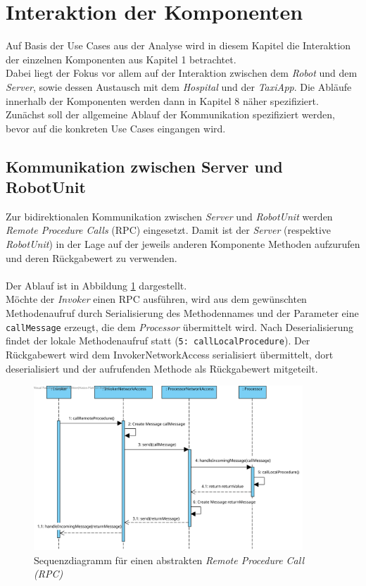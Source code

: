 \section{Interaktion der Komponenten}
Auf Basis der Use Cases aus der Analyse wird in diesem Kapitel die Interaktion der einzelnen Komponenten aus Kapitel 1 betrachtet. \\
Dabei liegt der Fokus vor allem auf der Interaktion zwischen dem \emph{Robot} und dem \emph{Server}, sowie dessen Austausch mit dem \emph{Hospital} und der \emph{TaxiApp}. 
Die Abläufe innerhalb der Komponenten werden dann in Kapitel 8 näher spezifiziert. \\
Zunächst soll der allgemeine Ablauf der Kommunikation spezifiziert werden, bevor auf die konkreten Use Cases eingangen wird.

\subsection*{Kommunikation zwischen Server und RobotUnit}
Zur bidirektionalen Kommunikation zwischen \emph{Server} und \emph{RobotUnit} werden \emph{Remote Procedure Calls} (RPC) eingesetzt. Damit ist der \emph{Server} (respektive \emph{RobotUnit}) in der Lage auf der jeweils anderen Komponente Methoden aufzurufen und deren Rückgabewert zu verwenden. \\ \\
Der Ablauf ist in Abbildung \ref{SequenzDiagrammRPC} dargestellt. \\ Möchte der \emph{Invoker} einen RPC ausführen, wird aus dem gewünschten Methodenaufruf durch Serialisierung des Methodennames und der Parameter eine \texttt{callMessage} erzeugt, die dem \emph{Processor} übermittelt wird. Nach Deserialisierung findet der lokale Methodenaufruf statt (\texttt{5: callLocalProcedure}). Der Rückgabewert wird dem InvokerNetworkAccess serialisiert übermittelt, dort deserialisiert und der aufrufenden Methode als Rückgabewert mitgeteilt.
\begin{figure}[H]
	\centering
	\includegraphics[width=0.9\textwidth]{img/2-Entwurf-Communication_RPC}
	\caption{Sequenzdiagramm für einen abstrakten \emph{Remote Procedure Call (RPC)}}
	\label{SequenzDiagrammRPC}
\end{figure}

